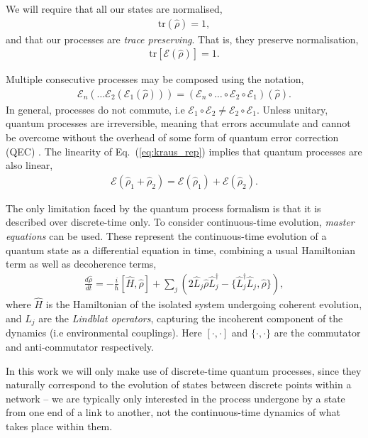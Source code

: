 \documentclass[aps,rmp,twocolumn,amsmath,amssymb,nofootinbib,superscriptaddress,longbibliography,floatfix,table-of-contents,eqsecnum]{revtex4-1}
\begin{document}
We will require that all our states are normalised,
\begin{align}
\text{tr}(\hat\rho) = 1,
\end{align}
and that our processes are \textit{trace preserving}. That is, they preserve normalisation,
\begin{align}
\text{tr}[\mathcal{E}(\hat\rho)] = 1.
\end{align}

Multiple consecutive processes may be composed using the notation,
\begin{align}
\mathcal{E}_n(\dots \mathcal{E}_2(\mathcal{E}_1(\hat\rho)))=(\mathcal{E}_n \circ \dots \circ \mathcal{E}_2\circ\mathcal{E}_1)(\hat\rho).
\end{align}
In general, processes do not commute, i.e \mbox{$\mathcal{E}_1\circ \mathcal{E}_2 \neq \mathcal{E}_2\circ \mathcal{E}_1$}. Unless unitary, quantum processes are irreversible, meaning that errors accumulate and cannot be overcome without the overhead of some form of quantum error correction (QEC) \cite{bib:Shor95, bib:CalderbankShor96, bib:NielsenChuang00}. The linearity of Eq.~(\ref{eq:kraus_rep}) implies that quantum processes are also linear,
\begin{align}
	\mathcal{E}(\hat\rho_1+\hat\rho_2) = \mathcal{E}(\hat\rho_1)+\mathcal{E}(\hat\rho_2).
\end{align}

The only limitation faced by the quantum process formalism is that it is described over discrete-time only. To consider continuous-time evolution, \textit{master equations} can be used. These represent the continuous-time evolution of a quantum state as a differential equation in time, combining a usual Hamiltonian term as well as decoherence terms,
\begin{align}
\frac{d\hat\rho}{dt} = -\frac{i}{\hbar}[\hat{H},\hat\rho] + \sum_j (2\hat{L}_j\hat\rho\hat{L}_j^\dag - \{\hat{L}_j^\dag\hat{L}_j,\hat\rho\}),
\end{align}
where $\hat{H}$ is the Hamiltonian of the isolated system undergoing coherent evolution, and $\hat{L}_j$ are the \textit{Lindblat operators}, capturing the incoherent component of the dynamics (i.e environmental couplings). Here $[\cdot,\cdot]$ and $\{\cdot,\cdot\}$ are the commutator and anti-commutator respectively.

In this work we will only make use of discrete-time quantum processes, since they naturally correspond to the evolution of states between discrete points within a network -- we are typically only interested in the process undergone by a state from one end of a link to another, not the continuous-time dynamics of what takes place within them.
\end{document}
